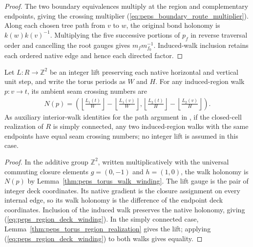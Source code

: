 \begin{proof}\leanok
    The two boundary equivalences multiply at the region and
    complementary endpoints, giving the crossing multiplier
    (\ref{eq:peps_boundary_route_multiplier}).
    Along each chosen tree path from $v$ to $w$, the original bond
    holonomy is $k(w)k(v)^{-1}$. Multiplying the five successive
    portions of $p_f$ in reverse traversal order and cancelling the
    root gauges gives $m_fm_{f_0}^{-1}$. Induced-walk inclusion retains
    each ordered native edge and hence each directed factor.
\end{proof}

\begin{lemma}%
    \label{thm:peps_region_walk_winding}
    \leanok
    Let $L:R\to\mathbb Z^2$ be an integer lift preserving each native
    horizontal and vertical unit step, and write the torus periods as
    $W$ and $H$. For any induced-region walk $p:v\to t$,
    its ambient seam crossing numbers are
    \begin{align}
        N(p)=\left(
        \left\lfloor\frac{L_1(t)}{W}\right\rfloor
        -\left\lfloor\frac{L_1(v)}{W}\right\rfloor,
        \left\lfloor\frac{L_2(t)}{H}\right\rfloor
        -\left\lfloor\frac{L_2(v)}{H}\right\rfloor
        \right).
        \label{eq:peps_region_deck_winding}
    \end{align}
    As auxiliary interior-walk identities for the path argument
    in \cite[proof of Theorem~6.9]{Schuch2010PEPS}, if the closed-cell realization of $R$ is simply connected,
    any two induced-region walks with the same endpoints have equal
    seam crossing numbers; no integer lift is assumed in this case.
\end{lemma}

\begin{proof}\leanok
    In the additive group $\mathbb Z^2$, written
    multiplicatively with the universal commuting closure elements
    $g=(0,-1)$ and $h=(1,0)$, the walk holonomy is $N(p)$ by
    Lemma~\ref{thm:peps_torus_walk_winding}. The lift gauge is the pair
    of integer deck coordinates. Its native gradient is the
    closure assignment on every internal edge, so its walk holonomy
    is the difference of the endpoint deck coordinates. Inclusion of
    the induced walk preserves the native holonomy, giving
    (\ref{eq:peps_region_deck_winding}). In the simply connected case,
    Lemma~\ref{thm:peps_torus_region_realization} gives the lift;
    applying (\ref{eq:peps_region_deck_winding}) to both walks gives
    equality.
\end{proof}

